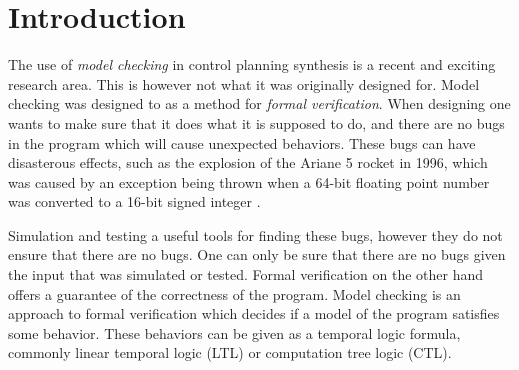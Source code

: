 \section{Introduction}
The use of \textit{model checking} in control planning synthesis is a recent and exciting research area. This is however not what it was originally designed for. Model checking was designed to as a method for \textit{formal verification}. When designing one wants to make sure that it does what it is supposed to do, and there are no bugs in the program which will cause unexpected behaviors. These bugs can have disasterous effects, such as the explosion of the Ariane 5 rocket in 1996, which was caused by an exception being thrown when a 64-bit floating point number was converted to a 16-bit signed integer \cite{clarke99}. 

Simulation and testing a useful tools for finding these bugs, however they do not ensure that there are no bugs. One can only be sure that there are no bugs given the input that was simulated or tested. Formal verification on the other hand offers a guarantee of the correctness of the program. Model checking is an approach to formal verification which decides if a model of the program satisfies some behavior. These behaviors can be given as a temporal logic formula, commonly linear temporal logic (LTL) or computation tree logic (CTL). 

